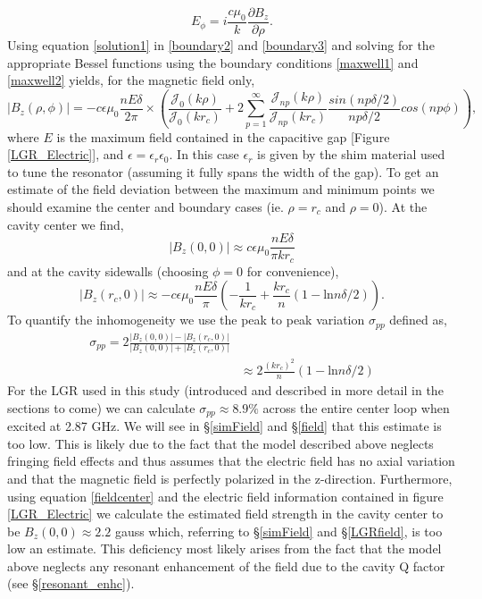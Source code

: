 \begin{equation}\label{boundary3}
E_{\phi} =  i \frac{ c \mu_0}{k}\frac{\partial B_z}{\partial \rho}.
\end{equation}
Using equation \ref{solution1} in \ref{boundary2} and \ref{boundary3} and solving for the appropriate Bessel functions using the boundary conditions \ref{maxwell1} and \ref{maxwell2} yields, for the magnetic field only,
\begin{equation}
|B_z(\rho,\phi)| = - c \epsilon\mu_0 \frac{n E \delta}{2\pi} \times \left(\frac{\mathcal{J}_0(k\rho)}{\mathcal{J}_0(k r_c)} + 2 \sum\limits_{p = 1}^{\infty} \frac{\mathcal{J}_{np}(k \rho)}{\mathcal{J}_{n p} (k r_c)} \frac{sin(np\delta/2)}{np\delta/2}cos(np\phi)\right),
\end{equation}
where $E$ is the maximum field contained in the capacitive gap [Figure \ref{LGR_Electric}], and $\epsilon = \epsilon_r\epsilon_0$. In this case $\epsilon_r$ is given by the shim material used to tune the resonator (assuming it fully spans the width of the gap). To get an estimate of the field deviation between the maximum and minimum points we should examine the center and boundary cases (ie. $\rho = r_c$ and $\rho = 0$). At the cavity center we find,
\begin{equation} \label{fieldcenter}
|B_z(0,0)| \approx c \epsilon\mu_0 \frac{nE\delta}{\pi k r_c}
\end{equation}
and at the cavity sidewalls (choosing $\phi = 0$ for convenience),
\begin{equation}
|B_z(r_c,0)| \approx -c\epsilon\mu_0 \frac{nE \delta}{\pi} \left(-\frac{1}{k r_c}+ \frac{k r_c}{n}(1-\text{ln} n\delta/2)\right).
\end{equation}
To quantify the inhomogeneity we use the peak to peak variation $\sigma_{pp}$ defined as,
\begin{equation} \label{homogeneity}
\begin{split}
\sigma_{pp} = 2\frac{|B_z(0,0)| - |B_z(r_c,0)|}{|B_z(0,0)| + |B_z(r_c,0)|} \\
& \approx 2\frac{(kr_c)^2}{n}(1-\text{ln}n\delta/2)
\end{split}
\end{equation}
For the LGR used in this study (introduced and described in more detail in the sections to come) we can calculate $\sigma_{pp} \approx 8.9\%$ across the entire center loop when excited at 2.87 GHz. We will see in \S \ref{simField} and \S \ref{field} that this estimate is too low. This is likely due to the fact that the model described above neglects fringing field effects and thus assumes that the electric field has no axial variation and that the magnetic field is perfectly polarized in the z-direction. Furthermore, using equation \ref{fieldcenter} and the electric field information contained in figure \ref{LGR_Electric} we calculate the estimated field strength in the cavity center to be $B_z(0,0) \approx 2.2$ gauss which, referring to \S \ref{simField} and \S \ref{LGRfield}, is too low an estimate. This deficiency most likely arises from the fact that the model above neglects any resonant enhancement of the field due to the cavity Q factor (see \S \ref{resonant_enhc}).
